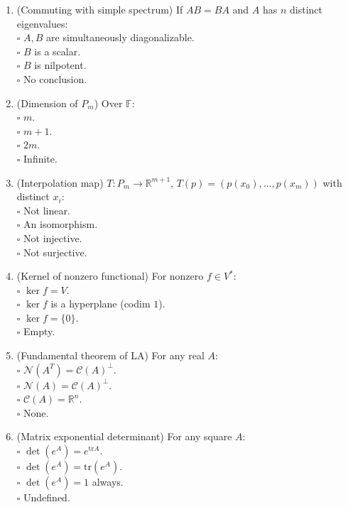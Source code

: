 \documentclass[11pt]{article}
\begin{document}
\begin{enumerate}
\item (Commuting with simple spectrum) If $AB=BA$ and $A$ has $n$ distinct eigenvalues:\\
\(\square\) $A,B$ are simultaneously diagonalizable.\\
\(\square\) $B$ is a scalar.\\
\(\square\) $B$ is nilpotent.\\
\(\square\) No conclusion.

\item (Dimension of $P_m$) Over $\mathbb{F}$:\\
\(\square\) $m$.\\
\(\square\) $m+1$.\\
\(\square\) $2m$.\\
\(\square\) Infinite.

\item (Interpolation map) $T:P_m\to\mathbb{R}^{m+1}$, $T(p)=(p(x_0),\dots,p(x_m))$ with distinct $x_i$:\\
\(\square\) Not linear.\\
\(\square\) An isomorphism.\\
\(\square\) Not injective.\\
\(\square\) Not surjective.

\item (Kernel of nonzero functional) For nonzero $f\in V^*$:\\
\(\square\) $\ker f=V$.\\
\(\square\) $\ker f$ is a hyperplane (codim $1$).\\
\(\square\) $\ker f=\{0\}$.\\
\(\square\) Empty.

\item (Fundamental theorem of LA) For any real $A$:\\
\(\square\) $\mathcal{N}(A^T)=\mathcal{C}(A)^\perp$.\\
\(\square\) $\mathcal{N}(A)=\mathcal{C}(A)^\perp$.\\
\(\square\) $\mathcal{C}(A)=\mathbb{R}^n$.\\
\(\square\) None.

\item (Matrix exponential determinant) For any square $A$:\\
\(\square\) $\det(e^A)=e^{\mathrm{tr}A}$.\\
\(\square\) $\det(e^A)=\mathrm{tr}(e^A)$.\\
\(\square\) $\det(e^A)=1$ always.\\
\(\square\) Undefined.


\end{enumerate}
\end{document}
